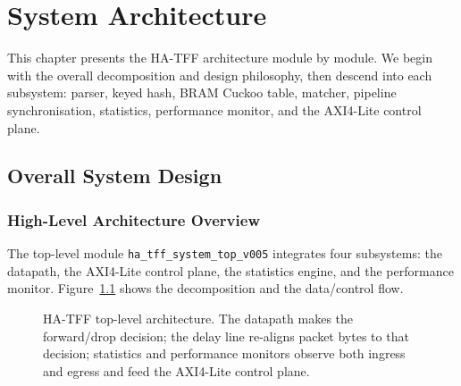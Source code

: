 \documentclass[12pt,twoside,openright]{book}
\begin{document}
\chapter{System Architecture}
\label{chap:architecture}

This chapter presents the HA-TFF architecture module by module. We begin with the overall
decomposition and design philosophy, then descend into each subsystem: parser, keyed hash, BRAM
Cuckoo table, matcher, pipeline synchronisation, statistics, performance monitor, and the AXI4-Lite
control plane.

\section{Overall System Design}

\subsection{High-Level Architecture Overview}

The top-level module \texttt{ha\_tff\_system\_top\_v005} integrates four subsystems: the datapath,
the AXI4-Lite control plane, the statistics engine, and the performance monitor. Figure~\ref{fig:top}
shows the decomposition and the data/control flow.

\begin{figure}[H]
\centering
\footnotesize
{}
\caption{HA-TFF top-level architecture. The datapath makes the forward/drop decision; the delay line
re-aligns packet bytes to that decision; statistics and performance monitors observe both ingress
and egress and feed the AXI4-Lite control plane.}
\label{fig:top}
\end{figure}
\end{document}
